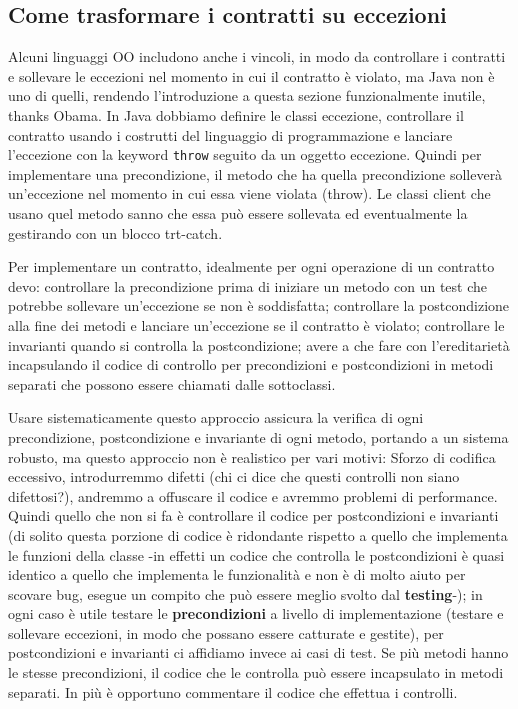         \subsection{Come trasformare i contratti su eccezioni}
            Alcuni linguaggi OO includono anche i vincoli, in modo da controllare i contratti e sollevare le eccezioni nel momento in cui il contratto è violato, ma Java non è uno di quelli, rendendo l'introduzione a questa sezione funzionalmente inutile, thanks Obama. In Java dobbiamo definire le classi eccezione, controllare il contratto usando i costrutti del linguaggio di programmazione e lanciare l'eccezione con la keyword \texttt{throw} seguito da un oggetto eccezione. Quindi per implementare una precondizione, il metodo che ha quella precondizione solleverà un'eccezione nel momento in cui essa viene violata (throw). Le classi client che usano quel metodo sanno che essa può essere sollevata ed eventualmente la gestirando con un blocco trt-catch.
            
            Per implementare un contratto, idealmente per ogni operazione di un contratto devo: controllare la precondizione prima di iniziare un metodo con un test che potrebbe sollevare un'eccezione se non è soddisfatta; controllare la postcondizione alla fine dei metodi e lanciare un'eccezione se il contratto è violato; controllare le invarianti quando si controlla la postcondizione; avere a che fare con l'ereditarietà incapsulando il codice di controllo per precondizioni e postcondizioni in metodi separati che possono essere chiamati dalle sottoclassi.
            
            Usare sistematicamente questo approccio assicura la verifica di ogni precondizione, postcondizione e invariante di ogni metodo, portando a un sistema robusto, ma questo approccio non è realistico per vari motivi: Sforzo di codifica eccessivo, introdurremmo difetti (chi ci dice che questi controlli non siano difettosi?), andremmo a offuscare il codice e avremmo problemi di performance. Quindi quello che non si fa è controllare il codice per postcondizioni e invarianti (di solito questa porzione di codice è ridondante rispetto a quello che implementa le funzioni della classe -in effetti un codice che controlla le postcondizioni è quasi identico a quello che implementa le funzionalità e non è di molto aiuto per scovare bug, esegue un compito che può essere meglio svolto dal \textbf{testing}-); in ogni caso è utile testare le \textbf{precondizioni} a livello di implementazione (testare e sollevare eccezioni, in modo che possano essere catturate e gestite), per postcondizioni e invarianti ci affidiamo invece ai casi di test. Se più metodi hanno le stesse precondizioni, il codice che le controlla può essere incapsulato in metodi separati. In più è opportuno commentare il codice che effettua i controlli.
            
